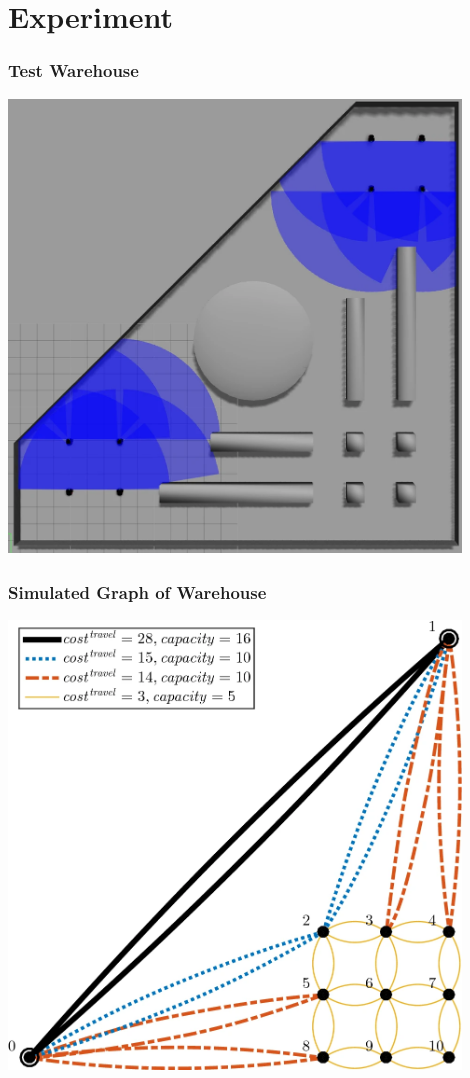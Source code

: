 \documentclass{beamer}
\begin{document}
	\section{Experiment}
	\begin{frame}
	\frametitle{Test Warehouse}
	\begin{center}
    \includegraphics[height=0.9\textheight,width=0.9\textwidth]{exp-r.png}
    \end{center}
	\end{frame}
	
	\begin{frame}
	\frametitle{Simulated Graph of Warehouse}
	\begin{center}
    \includegraphics[height=0.9\textheight,width=0.9\textwidth]{exp.png}
	\end{center}
	\end{frame}
	
\end{document}
